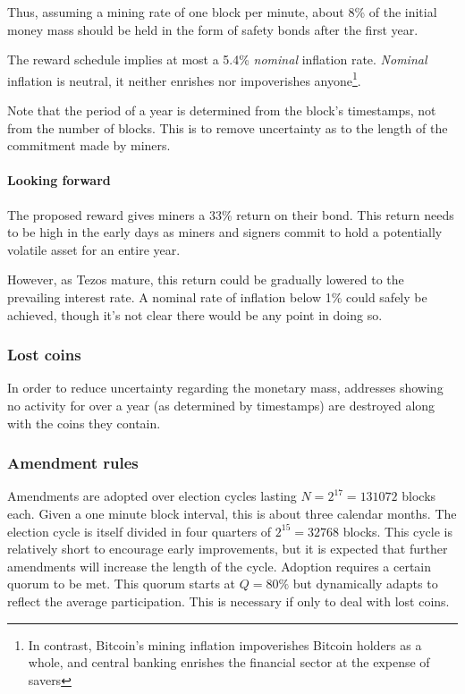 \documentclass[letterpaper]{article}
\begin{document}
Thus, assuming a mining rate of one block per minute, about 8\% of the initial
money mass should be held in the form of safety bonds after the first year.

The reward schedule implies at most a 5.4\% \emph{nominal} inflation
rate. \emph{Nominal} inflation is neutral, it neither enrishes nor
impoverishes anyone\footnote{In contrast, Bitcoin's mining inflation impoverishes
Bitcoin holders as a whole, and central banking enrishes the financial
sector at the expense of savers}.

Note that the period of a year is determined from the block's timestamps, not
from the number of blocks. This is to remove uncertainty as to the length of
the commitment made by miners. 

\paragraph{Looking forward}
The proposed reward gives miners a 33\% return on their bond.
This return needs to be high in the early days as miners and signers commit
to hold a potentially volatile asset for an entire year.

However, as Tezos mature, this return could be gradually lowered to the
prevailing interest rate. A nominal rate of inflation below 1\% could safely be
achieved, though it's not clear there would be any point in doing so.

\subsubsection{Lost coins}
In order to reduce uncertainty regarding the monetary mass, addresses
showing no activity for over a year (as determined by timestamps)
are destroyed along with the coins they contain.

\subsubsection{Amendment rules}
Amendments are adopted over election cycles lasting $N = 2^{17} = \num{131072}$
blocks each. Given a one minute block interval, this is about three calendar
months. The election cycle is itself divided in four quarters of
$2^{15} = \num{32768}$ blocks. This cycle is relatively short to encourage early
improvements, but it is expected that further amendments will increase the
length of the cycle. Adoption requires a certain quorum to be met. This quorum
starts at $Q = 80\%$ but dynamically adapts to reflect the average
participation. This is necessary if only to deal with lost coins.
 
\end{document}
